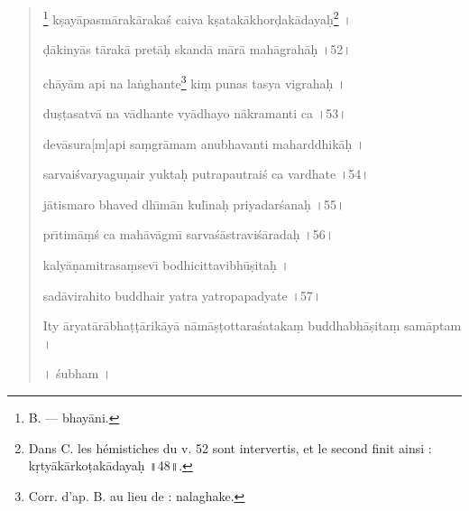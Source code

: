 \documentclass[a4paper, 11pt, oneside, french, landscape, twocolumn]{article}
\begin{document}
\begin{quotation}
\bigskip

\footnote{B. --- bhay\={a}ni.} k\d{s}ay\={a}pasm\={a}rak\={a}raka\'{s} caiva k\d{s}atak\={a}khor\d{d}ak\={a}daya\d{h}\footnote{Dans C. les hémistiches du v. 52 sont intervertis, et le second finit ainsi : k\d{r}ty\={a}k\={a}rko\d{t}ak\={a}daya\d{h} \texthindi{॥}48\texthindi{॥}.} \texthindi{।}

\d{d}\={a}kiny\={a}s t\={a}rak\={a} pret\={a}\d{h} skand\={a} m\={a}r\={a} mah\={a}grah\={a}\d{h} \texthindi{।}52\texthindi{।}

\bigskip

ch\={a}y\={a}m api na la\.{n}ghante\footnote{Corr. d'ap. B. au lieu de : nalaghake.} ki\d{m} punas tasya vigraha\d{h} \texthindi{।}

du\d{s}\d{t}asatv\={a} na v\={a}dhante vy\={a}dhayo n\={a}kramanti ca \texthindi{।}53\texthindi{।}

\bigskip

dev\={a}sura[m]api sa\d{m}gr\={a}mam anubhavanti maharddhik\={a}\d{h} \texthindi{।}

sarvai\'{s}varyagu\d{n}air yukta\d{h} putrapautrai\'{s} ca vardhate \texthindi{।}54\texthindi{।}

\bigskip

j\={a}tismaro bhaved dh\={\i}m\={a}n kul\={\i}na\d{h} priyadar\'{s}ana\d{h} \texthindi{।}55\texthindi{।}

\bigskip

pr\={\i}tim\={a}\d{m}\'{s} ca mah\={a}v\={a}gm\={\i} sarva\'{s}\={a}stravi\'{s}\={a}rada\d{h} \texthindi{।}56\texthindi{।}

\bigskip

kaly\={a}\d{n}amitrasa\d{m}sev\={\i} bodhicittavibh\={u}\d{s}ita\d{h} \texthindi{।}

sad\={a}virahito buddhair yatra yatropapadyate \texthindi{।}57\texthindi{।}

\bigskip

Ity \={a}ryat\={a}r\={a}bha\d{t}\d{t}\={a}rik\={a}y\={a} n\={a}m\={a}\d{s}\d{t}ottara\'{s}ataka\d{m} buddhabh\={a}\d{s}ita\d{m} sam\={a}ptam \texthindi{।}

\bigskip

\texthindi{।} \'{s}ubham \texthindi{।}
\end{quotation}
\clearpage
\end{document}
